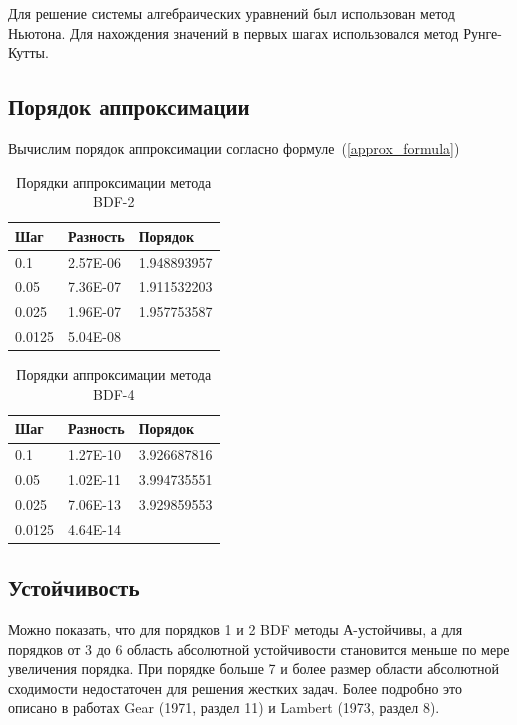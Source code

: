 \documentclass[12pt, a4paper]{article}
\begin{document}
Для решение системы алгебраических уравнений был использован метод Ньютона. Для нахождения значений в первых шагах использовался метод Рунге-Кутты.

\subsection{Порядок аппроксимации}

Вычислим порядок аппроксимации согласно формуле~(\ref{approx_formula})
\begin{table}[!h]
	\centering
	\begin{tabular}{|l|l|l|} 
		\hline
		Шаг      & Разность     & Порядок            \\ 
		\hline
		0.1    & 2.57E-06 & 1.948893957  \\ 
		\hline
		0.05   & 7.36E-07 & 1.911532203  \\ 
		\hline
		0.025  & 1.96E-07 & 1.957753587  \\ 
		\hline
		0.0125 & 5.04E-08 &              \\
		\hline
	\end{tabular}
	\vspace*{4mm}
	\label{table-BDF-2}
	\caption{Порядки аппроксимации метода BDF-2}
\end{table}

\begin{table}[!h]
	\centering
	\begin{tabular}{|l|l|l|} 
		\hline
		Шаг      & Разность     & Порядок \\        \hline
		0.1    & 1.27E-10 & 3.926687816  \\ 
		\hline
		0.05   & 1.02E-11 & 3.994735551  \\ 
		\hline
		0.025  & 7.06E-13 & 3.929859553  \\ 
		\hline
		0.0125 & 4.64E-14 &              \\
		\hline
	\end{tabular}
	\vspace*{4mm}
	\label{table-BDF-4}
	\caption{Порядки аппроксимации метода BDF-4}
\end{table}

\newpage

\subsection{Устойчивость}

Можно показать, что для порядков 1 и 2 BDF методы А-устойчивы, а для порядков от 3 до 6 область абсолютной устойчивости становится меньше по мере увеличения порядка. При порядке больше 7 и более размер области абсолютной сходимости недостаточен для решения жестких задач. Более подробно это описано в работах Gear (1971, раздел 11) и Lambert (1973, раздел 8).
\end{document}
